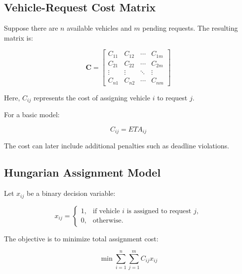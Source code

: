 \documentclass[12pt,a4paper]{article}
\begin{document}
\subsection{Vehicle-Request Cost Matrix}

Suppose there are $n$ available vehicles and $m$ pending requests.
The resulting matrix is:

\begin{equation}
\mathbf{C}
=
\begin{bmatrix}
C_{11} & C_{12} & \cdots & C_{1m} \\
C_{21} & C_{22} & \cdots & C_{2m} \\
\vdots & \vdots & \ddots & \vdots \\
C_{n1} & C_{n2} & \cdots & C_{nm}
\end{bmatrix}
\label{eq:costmatrix}
\end{equation}

Here, $C_{ij}$ represents the cost of assigning vehicle $i$ to
request $j$.

For a basic model:

\begin{equation}
    C_{ij}=ETA_{ij}
    \label{eq:basiccost}
\end{equation}

The cost can later include additional penalties such as deadline
violations.





\subsection{Hungarian Assignment Model}

Let $x_{ij}$ be a binary decision variable:

\begin{equation}
x_{ij}
=
\begin{cases}
1, & \text{if vehicle } i \text{ is assigned to request } j,\\
0, & \text{otherwise.}
\end{cases}
\label{eq:assignment}
\end{equation}

The objective is to minimize total assignment cost:

\begin{equation}
    \min
    \sum_{i=1}^{n}
    \sum_{j=1}^{m}
    C_{ij}x_{ij}
    \label{eq:hungarianobjective}
\end{equation}
\end{document}
